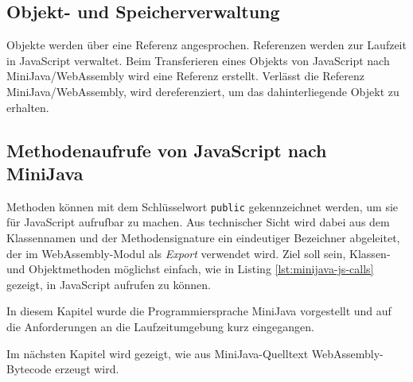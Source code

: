 \subsection{Objekt- und Speicherverwaltung}
Objekte werden über eine Referenz angesprochen. Referenzen werden zur Laufzeit in JavaScript verwaltet. Beim Transferieren eines Objekts von JavaScript nach MiniJava/WebAssembly wird eine Referenz erstellt. Verlässt die Referenz MiniJava/WebAssembly, wird dereferenziert, um das dahinterliegende Objekt zu erhalten.

\subsection{Methodenaufrufe von JavaScript nach MiniJava}
Methoden können mit dem Schlüsselwort \lstinline{public} gekennzeichnet werden, um sie für JavaScript aufrufbar zu machen. Aus technischer Sicht wird dabei aus dem Klassennamen und der Methodensignature ein eindeutiger Bezeichner abgeleitet, der im WebAssembly-Modul als \emph{Export} verwendet wird. Ziel soll sein, Klassen- und Objektmethoden möglichst einfach, wie in Listing \ref{lst:minijava-js-calls} gezeigt, in JavaScript aufrufen zu können.



\vspace{4em}
In diesem Kapitel wurde die Programmiersprache MiniJava vorgestellt und auf die Anforderungen an die Laufzeitumgebung kurz eingegangen.

Im nächsten Kapitel wird gezeigt, wie aus MiniJava-Quelltext WebAssembly-Bytecode erzeugt wird.
